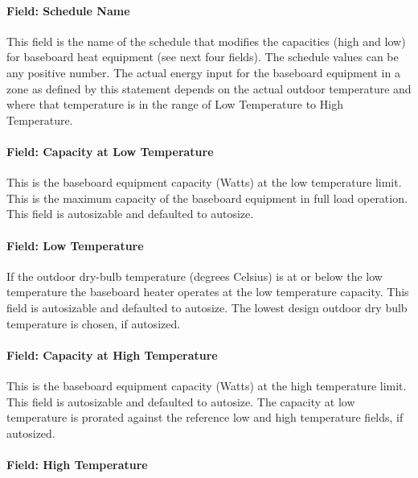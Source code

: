 \paragraph{Field: Schedule Name}\label{field-schedule-name-11}

This field is the name of the schedule that modifies the capacities (high and low) for baseboard heat equipment (see next four fields). The schedule values can be any positive number. The actual energy input for the baseboard equipment in a zone as defined by this statement depends on the actual outdoor temperature and where that temperature is in the range of Low Temperature to High Temperature.

\paragraph{Field: Capacity at Low Temperature}\label{field-capacity-at-low-temperature}

This is the baseboard equipment capacity (Watts) at the low temperature limit. This is the maximum capacity of the baseboard equipment in full load operation. This field is autosizable and defaulted to autosize.

\paragraph{Field: Low Temperature}\label{field-low-temperature}

If the outdoor dry-bulb temperature (degrees Celsius) is at or below the low temperature the baseboard heater operates at the low temperature capacity. This field is autosizable and defaulted to autosize. The lowest design outdoor dry bulb temperature is chosen, if autosized.

\paragraph{Field: Capacity at High Temperature}\label{field-capacity-at-high-temperature}

This is the baseboard equipment capacity (Watts) at the high temperature limit. This field is autosizable and defaulted to autosize. The capacity at low temperature is prorated against the reference low and high temperature fields, if autosized.

\paragraph{Field: High Temperature}\label{field-high-temperature}


